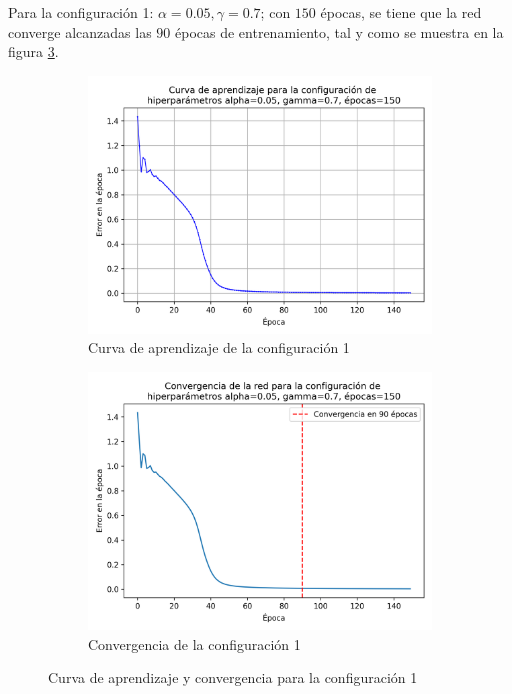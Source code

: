 \documentclass{article}
\begin{document}
Para la configuración 1: $\alpha=0.05, \gamma=0.7$; con $150$ épocas, se tiene que la red converge alcanzadas las $90$ épocas de entrenamiento, tal y como se muestra en la figura \ref{fig:conf1_lr_con_xor}.

\begin{figure}[h!]
    \centering
    \begin{subfigure}{0.49\textwidth}
        \includegraphics[width=\textwidth]{imgs/XOR/configs/curva_aprendizaje_alpha_0.05_gamma_0.7_epochs_150.png}
        \caption{Curva de aprendizaje de la configuración 1}
        \label{fig:conf_1_xor_lr}
    \end{subfigure}
    \hfill
    \begin{subfigure}{0.49\textwidth}
        \includegraphics[width=\textwidth]{imgs/XOR/configs/convergencia_alpha_0.05_gamma_0.7_epochs_150.png}
        \caption{Convergencia de la configuración 1}
        \label{fig:conf1_xor_con}
    \end{subfigure}
    \caption{Curva de aprendizaje y convergencia para la configuración 1}
    \label{fig:conf1_lr_con_xor}
\end{figure}
\end{document}
